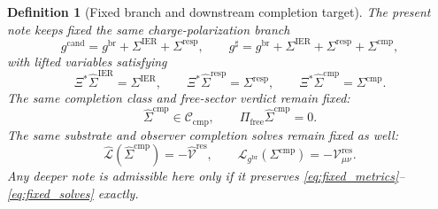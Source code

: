 \documentclass[11pt]{article}
\newcommand{\ObserverMap}{\Xi}
\newcommand{\ObserverMetric}{g^{\mathrm{br}}}
\newcommand{\CandidateMetric}{g^{\mathrm{cand}}}
\newcommand{\CompletedMetric}{g^{\sharp}}
\newcommand{\BaseShift}{\Sigma^{\mathrm{IER}}}
\newcommand{\ResponseShift}{\Sigma^{\mathrm{resp}}}
\newcommand{\CompShift}{\Sigma^{\mathrm{cmp}}}
\newcommand{\BaseLift}{\widehat\Sigma^{\mathrm{IER}}}
\newcommand{\ResponseLift}{\widehat\Sigma^{\mathrm{resp}}}
\newcommand{\CompLift}{\widehat\Sigma^{\mathrm{cmp}}}
\newcommand{\ResidualCore}{\mathcal V_{\mu\nu}^{\mathrm{res}}}
\newcommand{\ResidualLift}{\widehat{\mathcal V}^{\mathrm{res}}}
\newcommand{\SubReducedEin}{\widehat{\mathcal L}}
\newcommand{\FreeProj}{\Pi_{\mathrm{free}}}
\newcommand{\ReducedEin}{\mathcal L_{\ObserverMetric}}
\newcommand{\CompClass}{\mathscr C_{\mathrm{cmp}}}
\newtheorem{definition}{Definition}
\begin{document}
\begin{definition}[Fixed branch and downstream completion target]
\label{def:fixed_branch}
The present note keeps fixed the same charge-polarization branch
\begin{equation}
\CandidateMetric
=
\ObserverMetric+\BaseShift+\ResponseShift,
\qquad
\CompletedMetric
=
\ObserverMetric+\BaseShift+\ResponseShift+\CompShift,
\label{eq:fixed_metrics}
\end{equation}
with lifted variables satisfying
\begin{equation}
\ObserverMap^*\BaseLift=\BaseShift,
\qquad
\ObserverMap^*\ResponseLift=\ResponseShift,
\qquad
\ObserverMap^*\CompLift=\CompShift.
\label{eq:fixed_lifts}
\end{equation}
The same completion class and free-sector verdict remain fixed:
\begin{equation}
\CompLift\in\CompClass,
\qquad
\FreeProj\CompLift=0.
\label{eq:fixed_free}
\end{equation}
The same substrate and observer completion solves remain fixed as well:
\begin{equation}
\SubReducedEin(\CompLift)=-\ResidualLift,
\qquad
\ReducedEin(\CompShift)=-\ResidualCore.
\label{eq:fixed_solves}
\end{equation}
Any deeper note is admissible here only if it preserves \eqref{eq:fixed_metrics}--\eqref{eq:fixed_solves} exactly.
\end{definition}
\end{document}
